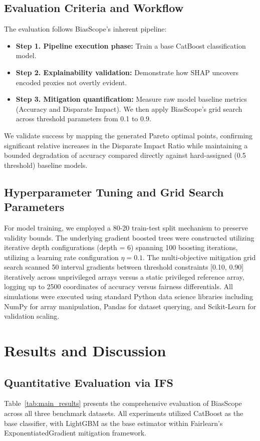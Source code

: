 \documentclass[conference]{IEEEtran}
\begin{document}
\subsection{Evaluation Criteria and Workflow}
The evaluation follows BiasScope's inherent pipeline:
\begin{itemize}
    \item \textbf{Step 1. Pipeline execution phase:} Train a base CatBoost classification model.
    \item \textbf{Step 2. Explainability validation:} Demonstrate how SHAP uncovers encoded proxies not overtly evident.
    \item \textbf{Step 3. Mitigation quantification:} Measure raw model baseline metrics (Accuracy and Disparate Impact). We then apply BiasScope's grid search across threshold parameters from 0.1 to 0.9.
\end{itemize}
We validate success by mapping the generated Pareto optimal points, confirming significant relative increases in the Disparate Impact Ratio while maintaining a bounded degradation of accuracy compared directly against hard-assigned (0.5 threshold) baseline models.

\subsection{Hyperparameter Tuning and Grid Search Parameters}
For model training, we employed a 80-20 train-test split mechanism to preserve validity bounds. The underlying gradient boosted trees were constructed utilizing iterative depth configurations (depth = 6) spanning 100 boosting iterations, utilizing a learning rate configuration $\eta = 0.1$. The multi-objective mitigation grid search scanned 50 interval gradients between threshold constraints [0.10, 0.90] iteratively across unprivileged arrays versus a static privileged reference array, logging up to 2500 coordinates of accuracy versus fairness differentials. All simulations were executed using standard Python data science libraries including NumPy for array manipulation, Pandas for dataset querying, and Scikit-Learn for validation scaling.

\section{Results and Discussion} \label{sec:results}

\subsection{Quantitative Evaluation via IFS}
Table~\ref{tab:main_results} presents the comprehensive evaluation of BiasScope across all three benchmark datasets. All experiments utilized CatBoost as the base classifier, with LightGBM as the base estimator within Fairlearn's ExponentiatedGradient mitigation framework.
\end{document}
